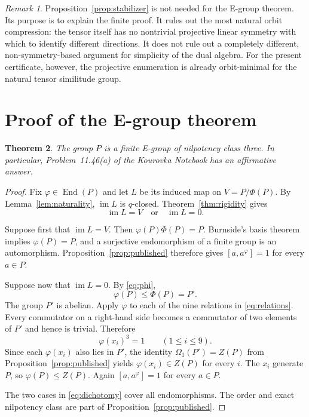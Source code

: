 \documentclass[11pt]{amsart}
\newtheorem{theorem}{Theorem}[section]
\theoremstyle{definition}
\theoremstyle{remark}
\newtheorem{remark}[theorem]{Remark}
\newcommand{\End}{\operatorname{End}}
\newcommand{\im}{\operatorname{im}}
\begin{document}
\begin{remark}\label{rem:orbit-no-go}
Proposition~\ref{prop:stabilizer} is not needed for the E-group theorem.
Its purpose is to explain the finite proof.  It rules out the most natural
orbit compression: the tensor itself has no nontrivial projective linear
symmetry with which to identify different directions.  It does not rule
out a completely different, non-symmetry-based argument for simplicity of
the dual algebra.  For the present certificate, however, the projective
enumeration is already orbit-minimal for the natural tensor similitude
group.
\end{remark}

\section{Proof of the E-group theorem}\label{sec:main}

\begin{theorem}\label{thm:main}
The group $P$ is a finite E-group of nilpotency class three.  In
particular, Problem~11.46(a) of the Kourovka Notebook has an affirmative
answer.
\end{theorem}

\begin{proof}
Fix $\varphi\in\End(P)$ and let $L$ be its induced map on
$V=P/\Phi(P)$.  By Lemma~\ref{lem:naturality}, $\im L$ is $q$-closed.
Theorem~\ref{thm:rigidity} gives
\begin{equation}\label{eq:dichotomy}
                             \im L=V\quad\text{or}\quad\im L=0.
\end{equation}

Suppose first that $\im L=V$.  Then
$\varphi(P)\Phi(P)=P$.  Burnside's basis theorem implies
$\varphi(P)=P$, and a surjective endomorphism of a finite group is an
automorphism.  Proposition~\ref{prop:published} therefore gives
$[a,a^\varphi]=1$ for every $a\in P$.

Suppose now that $\im L=0$.  By \eqref{eq:phi},
\[
                         \varphi(P)\leq\Phi(P)=P'.
\]
The group $P'$ is abelian.  Apply $\varphi$ to each of the nine relations
in \eqref{eq:relations}.  Every commutator on a right-hand side becomes a
commutator of two elements of $P'$ and hence is trivial.  Therefore
\[
                         \varphi(x_i)^3=1
                         \qquad(1\leq i\leq9).
\]
Since each $\varphi(x_i)$ also lies in $P'$, the identity
$\Omega_1(P')=Z(P)$ from Proposition~\ref{prop:published} yields
$\varphi(x_i)\in Z(P)$ for every $i$.  The $x_i$ generate $P$, so
$\varphi(P)\leq Z(P)$.  Again $[a,a^\varphi]=1$ for every $a\in P$.

The two cases in \eqref{eq:dichotomy} cover all endomorphisms.  The order
and exact nilpotency class are part of Proposition~\ref{prop:published}.
\end{proof}
\end{document}

